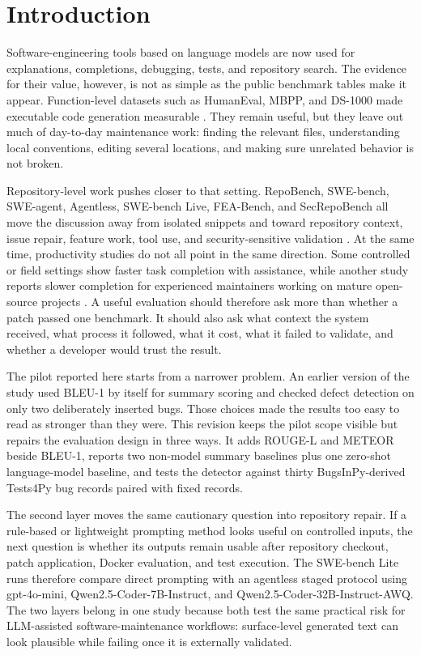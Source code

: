 \documentclass[preprint,12pt]{elsarticle}
\begin{document}
\section{Introduction}

Software-engineering tools based on language models are now used for explanations, completions, debugging, tests, and repository search. The evidence for their value, however, is not as simple as the public benchmark tables make it appear. Function-level datasets such as HumanEval, MBPP, and DS-1000 made executable code generation measurable \cite{chen2021codex,austin2021mbpp,lai2022ds1000}. They remain useful, but they leave out much of day-to-day maintenance work: finding the relevant files, understanding local conventions, editing several locations, and making sure unrelated behavior is not broken.

Repository-level work pushes closer to that setting. RepoBench, SWE-bench, SWE-agent, Agentless, SWE-bench Live, FEA-Bench, and SecRepoBench all move the discussion away from isolated snippets and toward repository context, issue repair, feature work, tool use, and security-sensitive validation \cite{liu2023repobench,jimenez2023swebench,yang2024sweagent,xia2024agentless,zhang2025swebenchlive,li2025feabench,shen2025secrepobench}. At the same time, productivity studies do not all point in the same direction. Some controlled or field settings show faster task completion with assistance, while another study reports slower completion for experienced maintainers working on mature open-source projects \cite{peng2023copilot,paradis2024speed,cui2026effects,becker2025maintainers}. A useful evaluation should therefore ask more than whether a patch passed one benchmark. It should also ask what context the system received, what process it followed, what it cost, what it failed to validate, and whether a developer would trust the result.

The pilot reported here starts from a narrower problem. An earlier version of the study used BLEU-1 by itself for summary scoring and checked defect detection on only two deliberately inserted bugs. Those choices made the results too easy to read as stronger than they were. This revision keeps the pilot scope visible but repairs the evaluation design in three ways. It adds ROUGE-L and METEOR beside BLEU-1, reports two non-model summary baselines plus one zero-shot language-model baseline, and tests the detector against thirty BugsInPy-derived Tests4Py bug records paired with fixed records.

The second layer moves the same cautionary question into repository repair. If a rule-based or lightweight prompting method looks useful on controlled inputs, the next question is whether its outputs remain usable after repository checkout, patch application, Docker evaluation, and test execution. The SWE-bench Lite runs therefore compare direct prompting with an agentless staged protocol using gpt-4o-mini, Qwen2.5-Coder-7B-Instruct, and Qwen2.5-Coder-32B-Instruct-AWQ. The two layers belong in one study because both test the same practical risk for LLM-assisted software-maintenance workflows: surface-level generated text can look plausible while failing once it is externally validated.
\end{document}
